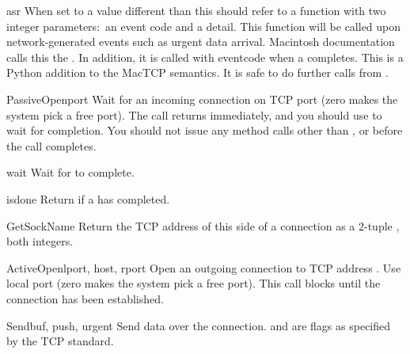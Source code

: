 \begin{memberdesc}{asr}
When set to a value different than  this should refer to a
function with two integer parameters:\ an event code and a detail. This
function will be called upon network-generated events such as urgent
data arrival.  Macintosh documentation calls this the
.  In addition, it is called with
eventcode  when a 
completes. This is a Python addition to the MacTCP semantics.
It is safe to do further calls from .
\end{memberdesc}


\begin{methoddesc}{PassiveOpen}{port}
Wait for an incoming connection on TCP port  (zero makes the
system pick a free port). The call returns immediately, and you should
use  to wait for completion. You should not issue any method
calls other than ,  or
 before the call completes.
\end{methoddesc}

\begin{methoddesc}{wait}{}
Wait for  to complete.
\end{methoddesc}

\begin{methoddesc}{isdone}{}
Return  if a  has completed.
\end{methoddesc}

\begin{methoddesc}{GetSockName}{}
Return the TCP address of this side of a connection as a 2-tuple
, both integers.
\end{methoddesc}

\begin{methoddesc}{ActiveOpen}{lport, host, rport}
Open an outgoing connection to TCP address . Use
local port  (zero makes the system pick a free port). This
call blocks until the connection has been established.
\end{methoddesc}

\begin{methoddesc}{Send}{buf, push, urgent}
Send data  over the connection.  and 
are flags as specified by the TCP standard.
\end{methoddesc}

